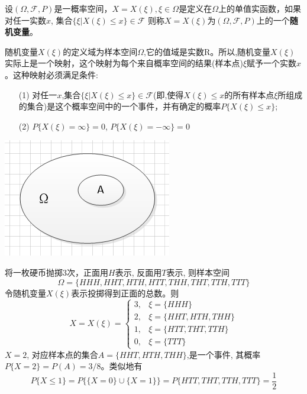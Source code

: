 \begin{frame}
\begin{definition}
	设$(\Omega,\mathcal{F},P)$是一概率空间，$X=X(\xi),\xi\in\Omega$是定义在$\Omega$上的单值实函数，如果对任一实数$x$, 集合$\{\xi|X(\xi)\le x\}\in\mathcal{F}$ 则称$X=X(\xi)$为$(\Omega,\mathcal{F},P)$上的一个\textbf{随机变量}。
	
	随机变量$X(\xi)$的定义域为样本空间$\Omega$,它的值域是实数R。所以,随机变量$X(\xi)$实际上是一个映射，这个映射为每个来自概率空间的结果(样本点)$\xi$赋予一个实数$x$。这种映射必须满足条件:
	\begin{itemize}
		\item[(1)] 对任一$x$,集合$\{\xi|X(\xi)\le x\}\in\mathcal{F}$(即,使得$X(\xi)\le x$的所有样本点$\xi$所组成的集合)是这个概率空间中的一个事件，并有确定的概率$P\{X(\xi)\le x\}$;
		\item[(2)] $P\{X(\xi)=\infty \}=0$, $P\{X(\xi)=-\infty \}=0$
	\end{itemize}
\end{definition}
\includegraphics[scale=0.2]{geometry}
\end{frame}

\begin{frame}
\begin{example}
	将一枚硬币抛掷3次，正面用$H$表示, 反面用$T$表示, 则样本空间
	\[\Omega=\{HHH,HHT,HTH,HTT,THH,THT,TTH,TTT\} \]
	令随机变量$X(\xi)$表示投掷得到正面的总数。则
	\[ 
		X=X(\xi)=
		\begin{cases}
		3, &\xi=\{HHH\}\\
		2, &\xi=\{HHT,HTH,THH\}\\
		1, &\xi=\{HTT,THT,TTH\}\\
		0, &\xi=\{TTT\}
		\end{cases}
	\]
	$X=2$, 对应样本点的集合$A=\{HHT,HTH,THH\}$,是一个事件, 其概率$P\{X=2\}=P(A)=3/8$。类似地有
	\[ P\{X\le 1\}=P\{\{X=0\}\cup\{X=1\}\}=P\{HTT,THT,TTH,TTT\}=\frac{1}{2} \]
\end{example}
\end{frame}

